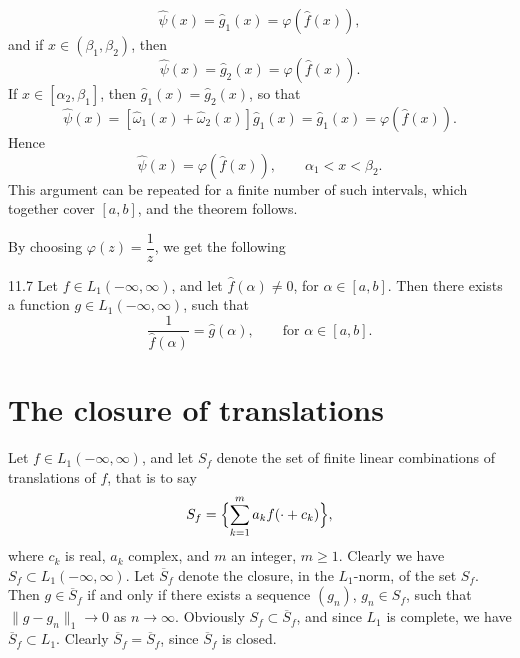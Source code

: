 \begin{equation*}
\widehat\psi(x)=\widehat g_1(x)=\varphi(\widehat f(x)),
\end{equation*}
and if $x\in(\beta_1,\beta_2)$, then
\begin{equation*}
\widehat\psi(x)=\widehat g_2(x)=\varphi(\widehat f(x)).
\end{equation*}
If $x\in[\alpha_2,\beta_1]$, then $\widehat g_1(x)=\widehat g_2(x)$, so that
\begin{equation*}
\widehat\psi(x)=[\widehat\omega_1(x)+\widehat\omega_2(x)]\widehat g_1(x)=\widehat g_1(x)=\varphi(\widehat f(x)).
\end{equation*}
Hence
\begin{equation*}
\widehat\psi(x)=\varphi(\widehat f(x)),\qquad\alpha_1<x<\beta_2.
\end{equation*}
This argument can be repeated for a finite number of such intervals, which together cover $[a,b]$, and the theorem follows.

By choosing $\varphi(z)=\dfrac{1}{z}$, we get the following

\begin{nstmt}{11.7}\label{eq:I-11.7}
Let $f\in L_1(-\infty,\infty)$, and let $\widehat f(\alpha)\neq 0$, for $\alpha\in[a,b]$. Then there exists a function $g\in L_1(-\infty,\infty)$, such that
\[
\frac{1}{\widehat f(\alpha)}=\widehat g(\alpha),\qquad\text{for }\alpha\in[a,b].
\]
\end{nstmt}

\section{The closure of translations}
\label{sec:I-12}

Let $f\in L_1(-\infty,\infty)$, and let $S_f$ denote the set of finite linear combinations of translations of $f$, that is to say
\begin{equation*}
S_f=\Bigl\{\sum_{k=1}^{m}a_kf(\cdot+c_k)\Bigr\},
\end{equation*}
where $c_k$ is real, $a_k$ complex, and $m$ an integer, $m\ge 1$. Clearly we have $S_f\subset L_1(-\infty,\infty)$. Let $\overline S_f$ denote the closure, in the $L_1$-norm, of the set $S_f$. Then $g\in\overline S_f$ if and only if there exists a sequence $(g_n)$, $g_n\in S_f$, such that $\|g-g_n\|_1\to 0$ as $n\to\infty$. Obviously $S_f\subset\overline S_f$, and since $L_1$ is complete, we have $\overline S_f\subset L_1$. Clearly $\overline S_f=\overline S_f$, since $\overline S_f$ is closed.

